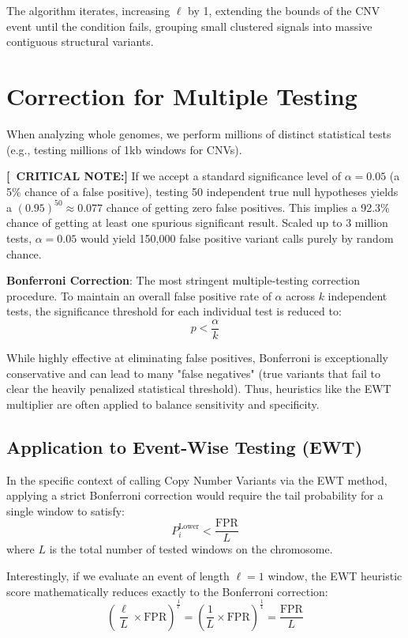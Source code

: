 \documentclass[11pt,a4paper]{article}
\newenvironment{important}{
    \vspace{1em}
    \begin{tcolorbox}[colback=blue!5!white, colframe=blue!75!black, boxrule=1pt, arc=4pt, left=10pt, right=10pt, top=10pt, bottom=10pt]
}{
    \end{tcolorbox}
    \vspace{1em}
}
\newcommand{\sta}{\textbf{[\textasteriskcentered\ CRITICAL NOTE:] }}
\begin{document}
The algorithm iterates, increasing \(\ell\) by 1, extending the bounds of the CNV event until the condition fails, grouping small clustered signals into massive contiguous structural variants.

\section{Correction for Multiple Testing}
When analyzing whole genomes, we perform millions of distinct statistical tests (e.g., testing millions of 1kb windows for CNVs). 

\sta If we accept a standard significance level of \(\alpha = 0.05\) (a 5\% chance of a false positive), testing 50 independent true null hypotheses yields a \((0.95)^{50} \approx 0.077\) chance of getting zero false positives. This implies a 92.3\% chance of getting at least one spurious significant result. Scaled up to 3 million tests, \(\alpha = 0.05\) would yield 150,000 false positive variant calls purely by random chance.

\begin{important}
  \textbf{Bonferroni Correction}: The most stringent multiple-testing correction procedure. To maintain an overall false positive rate of \(\alpha\) across \( k \) independent tests, the significance threshold for each individual test is reduced to:
  \[ p < \frac{\alpha}{k} \]
\end{important}

While highly effective at eliminating false positives, Bonferroni is exceptionally conservative and can lead to many "false negatives" (true variants that fail to clear the heavily penalized statistical threshold). Thus, heuristics like the EWT multiplier are often applied to balance sensitivity and specificity.

\subsection{Application to Event-Wise Testing (EWT)}
In the specific context of calling Copy Number Variants via the EWT method, applying a strict Bonferroni correction would require the tail probability for a single window to satisfy:
\[ P_i^{\text{Lower}} < \frac{\text{FPR}}{L} \]
where \( L \) is the total number of tested windows on the chromosome.

Interestingly, if we evaluate an event of length \( \ell = 1 \) window, the EWT heuristic score mathematically reduces exactly to the Bonferroni correction:
\[ \left( \frac{\ell}{L} \times \text{FPR} \right)^{\frac{1}{\ell}} = \left( \frac{1}{L} \times \text{FPR} \right)^{\frac{1}{1}} = \frac{\text{FPR}}{L} \]
\end{document}
